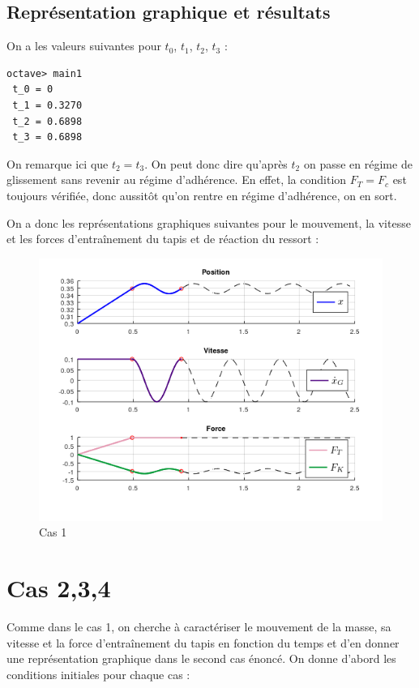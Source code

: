 \documentclass{article}
\newcommand{\ts}{\scriptscriptstyle}
\begin{document}
\subsection{Représentation graphique et résultats}
On a les valeurs suivantes pour $t_0$, $t_1$, $t_2$, $t_3$ :
\begin{lstlisting}
octave> main1
 t_0 = 0
 t_1 = 0.3270
 t_2 = 0.6898
 t_3 = 0.6898
\end{lstlisting}

On remarque ici que $t_2 = t_3$. On peut donc dire qu'après $t_2$ on passe en régime de glissement sans revenir au régime d'adhérence. En effet, la condition $F_{\ts{T}} = F_c$ est toujours vérifiée, donc aussitôt qu'on rentre en régime d'adhérence, on en sort.

On a donc les représentations graphiques suivantes pour le mouvement, la vitesse et les forces d'entraînement du tapis et de réaction du ressort : 

\begin{figure}[h!]
	\centering
	\includegraphics[scale=.6]{CAS1.png}
	\caption{Cas 1}
\end{figure}

\newpage

\section{Cas 2,3,4}
Comme dans le cas 1, on cherche à caractériser le mouvement de la masse, sa vitesse et la force d'entraînement du tapis en fonction du temps et d'en donner une représentation graphique dans le second cas énoncé. On donne d'abord les conditions initiales pour chaque cas :
\end{document}
